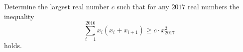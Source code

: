 Determine the largest real number $c$ such that for any $2017$ real numbers  the inequality $$\sum_{i=1}^{2016}x_i(x_i+x_{i+1})\ge c\cdot x^2_{2017}$$holds.